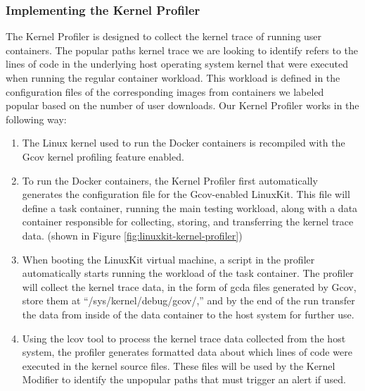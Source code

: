 \subsubsection{Implementing the Kernel Profiler}
\label{sec.design.implementation.kernel_profiler}
The Kernel Profiler is designed to collect the kernel trace of running user containers. 
The popular paths kernel trace we are looking to identify refers to the lines of code in the underlying host operating system kernel that were executed when running the regular container workload. 
This workload is defined in the configuration files of the corresponding images from containers we labeled popular based on the number of user downloads. 
Our Kernel Profiler works in the following way: 
\begin{enumerate}
	\item The Linux kernel used to run the Docker containers is recompiled with the Gcov \cite{gcov} kernel profiling feature enabled. 
	\item To run the Docker containers, the Kernel Profiler first automatically generates the configuration file for the Gcov-enabled LinuxKit. 
	This file will define a task container, running the main testing workload, along with a data container responsible for collecting, storing, and transferring the kernel trace data. 
	(shown in Figure \ref{fig:linuxkit-kernel-profiler})
	\item When booting the LinuxKit virtual machine, a script in the profiler automatically starts running the workload of the task container. 
	The profiler will collect the kernel trace data, in the form of gcda files generated by Gcov, store them at ``/sys/kernel/debug/gcov/,'' 
	and by the end of the run transfer the data from inside of the data container to the host system for further use. 
	\item Using the lcov \cite{lcov} tool to process the kernel trace data collected from the host system, the profiler generates formatted data about which lines of code were executed in the kernel source files. 
	These files will be used by the  Kernel Modifier to identify the unpopular paths that must trigger an alert if used. 
\end{enumerate}


